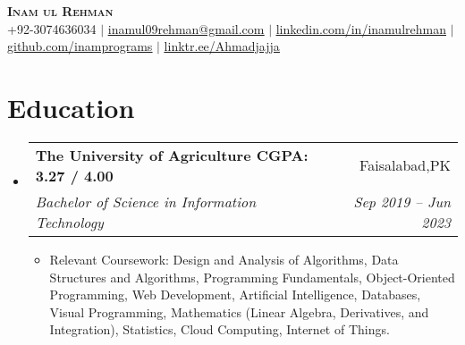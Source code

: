 \documentclass[letterpaper,11pt]{article}
\makeatletter
\newcommand{\resumeItem}[1]{
  \item\small{
    {#1 \vspace{-2pt}}
  }
}
\newcommand{\resumeSubheading}[4]{
  \vspace{-2pt}\item
    \begin{tabular*}{0.97\textwidth}[t]{l@{\extracolsep{\fill}}r}
      \textbf{#1} & #2 \\
      \textit{\small#3} & \textit{\small #4} \\
    \end{tabular*}\vspace{-7pt}
}
\newcommand{\resumeSubHeadingListStart}{\begin{itemize}[leftmargin=0.15in, label={}]}
\newcommand{\resumeSubHeadingListEnd}{\end{itemize}}
\newcommand{\resumeItemListStart}{\begin{itemize}}
\newcommand{\resumeItemListEnd}{\end{itemize}\vspace{-5pt}}
\makeatother
\begin{document}

\begin{center}
  \textbf{\Huge \scshape Inam ul Rehman } \\ \vspace{1pt}
  \small +92-3074636034 $|$
  \href{mailto:inamul09rehman@gmail.com}{\underline{inamul09rehman@gmail.com}} $|$
  \href{https://www.linkedin.com/in/inamulrehman/}{\underline{linkedin.com/in/inamulrehman}} $|$
  \href{https://github.com/inamprograms}{\underline{github.com/inamprograms}} $|$
  \href{https://linktr.ee/Ahmadjajja}{\underline{linktr.ee/Ahmadjajja}}
\end{center}

\section{Education}
\resumeSubHeadingListStart
\resumeSubheading
{The University of Agriculture \hspace{3.5cm} CGPA: 3.27 / 4.00}{Faisalabad,PK}
{Bachelor of Science in Information Technology}{Sep 2019 -- Jun 2023}
\resumeItemListStart
\resumeItem{Relevant Coursework: Design and Analysis of Algorithms, Data Structures and Algorithms, Programming Fundamentals, Object-Oriented Programming, Web Development, Artificial Intelligence, Databases, Visual Programming, Mathematics (Linear Algebra, Derivatives, and Integration), Statistics, Cloud Computing, Internet of Things.}
\resumeItemListEnd
\resumeSubHeadingListEnd
%
\end{document}

